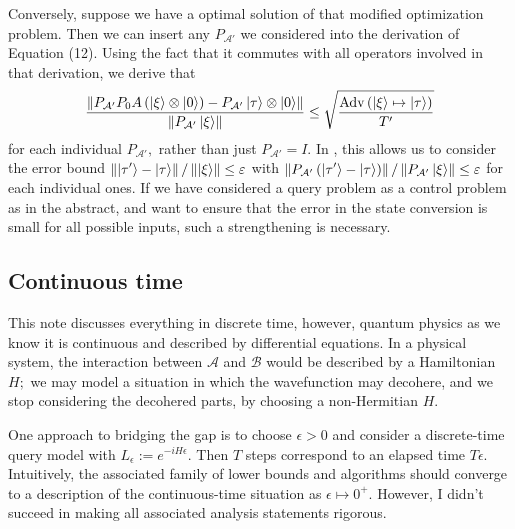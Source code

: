 \documentclass{article}
\begin{document}
Conversely, suppose we have a optimal solution of that modified optimization problem. Then we can insert any $\displaystyle P_{\mathcal{A} '}$ we considered into the derivation of Equation (12). Using the fact that it commutes with all operators involved in that derivation, we derive that
\begin{equation}
\frac{\left\Vert P_{\mathcal{A} '} P_{0} A\left(\ket{\xi } \otimes \ket{0}\right) -P_{\mathcal{A} '}\ket{\tau } \otimes \ket{0}\right\Vert}{\left\Vert P_{\mathcal{A} '}\ket{\xi }\right\Vert} \leq \sqrt{\frac{\mathrm{Adv}\left(\ket{\xi } \mapsto \ket{\tau }\right)}{T'}}
\end{equation}
for each individual $\displaystyle P_{\mathcal{A} '} ,$ rather than just $\displaystyle P_{\mathcal{A} '} =I.$ In , this allows us to consider the error bound $\displaystyle \left\Vert \ket{\tau '} -\ket{\tau }\right\Vert /\left\Vert \ket{\xi }\right\Vert \leq \varepsilon $ with $\displaystyle \left\Vert P_{\mathcal{A} '}\left(\ket{\tau '} -\ket{\tau }\right)\right\Vert /\left\Vert P_{\mathcal{A} '}\ket{\xi }\right\Vert \leq \varepsilon $ for each individual ones. If we have considered a query problem as a control problem as in the abstract, and want to ensure that the error in the state conversion is small for all possible inputs, such a strengthening is necessary.

 
\subsection{Continuous time}

This note discusses everything in discrete time, however, quantum physics as we know it is continuous and described by differential equations. In a physical system, the interaction between $\displaystyle \mathcal{A}$ and $\displaystyle \mathcal{B}$ would be described by a Hamiltonian $\displaystyle H;$ we may model a situation in which the wavefunction may decohere, and we stop considering the decohered parts, by choosing a non-Hermitian $\displaystyle H.$



One approach to bridging the gap is to choose $\displaystyle \epsilon  >0$ and consider a discrete-time query model with $\displaystyle L_{\epsilon } :=e^{-iH \epsilon } .$ Then $\displaystyle T$ steps correspond to an elapsed time $\displaystyle T\epsilon .$ Intuitively, the associated family of lower bounds and algorithms should converge to a description of the continuous-time situation as $\displaystyle \epsilon \mapsto 0^{+} .$ However, I didn't succeed in making all associated analysis statements rigorous.
\end{document}
